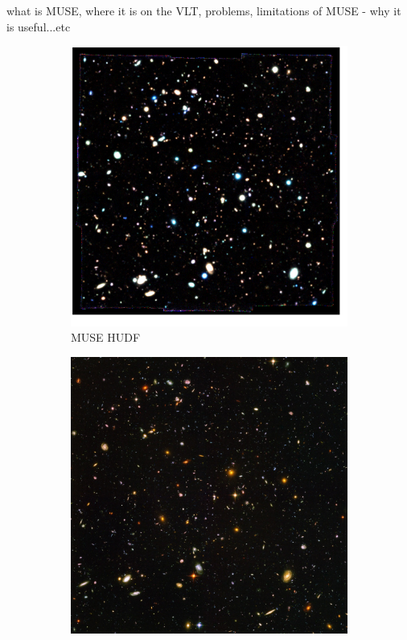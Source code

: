 \documentclass[12pt, twocolumn]{revtex4}    %
\begin{document}
what is MUSE, where it is on the VLT, problems, limitations of MUSE - why it is useful...etc

\onecolumngrid

\begin{figure}
  \begin{subfigure}[b]{0.4\textwidth}
    \includegraphics[width=\textwidth]{introduction/muse_colour_image}
    \captionsetup{justification=justified}    
    \caption{MUSE HUDF}               
    \label{fig:muse_colour_image}
  \end{subfigure}
  \begin{subfigure}[b]{0.4\textwidth}
    \includegraphics[width=\textwidth]{introduction/hubble_ultra_deep_field}

\end{subfigure}
\end{figure}
\end{document}
